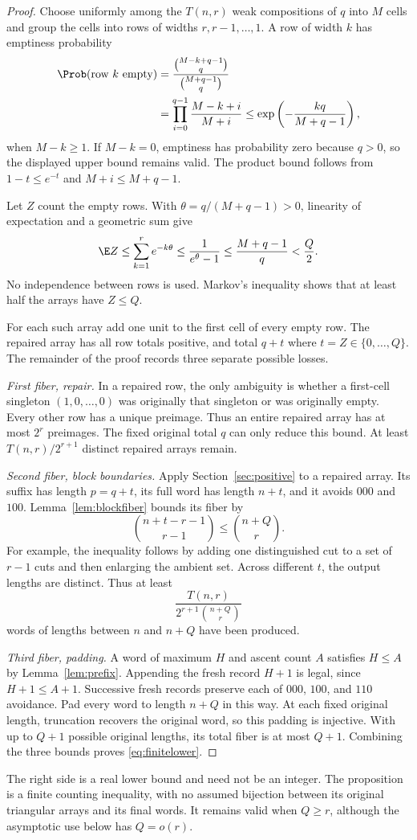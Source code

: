 \begin{proof}
Choose uniformly among the $T(n,r)$ weak compositions of $q$ into $M$ cells and group the cells into rows of widths $r,r-1,\ldots,1$. A row of width $k$ has emptiness probability
\begin{align}
 \Prob(\text{row }k\text{ empty})
 &=\frac{\binom{M-k+q-1}{q}}{\binom{M+q-1}{q}}\notag\\
 &=\prod_{i=0}^{q-1}\frac{M-k+i}{M+i}
 \le\exp\left(-\frac{kq}{M+q-1}\right),\label{eq:empty}
\end{align}
when $M-k\ge1$. If $M-k=0$, emptiness has probability zero because $q>0$, so the displayed upper bound remains valid. The product bound follows from $1-t\le e^{-t}$ and $M+i\le M+q-1$.

Let $Z$ count the empty rows. With $\theta=q/(M+q-1)>0$, linearity of expectation and a geometric sum give
\begin{equation}\label{eq:expect}
 \E Z\le\sum_{k=1}^r e^{-k\theta}
 \le\frac1{e^\theta-1}\le\frac{M+q-1}{q}<\frac Q2.
\end{equation}
No independence between rows is used. Markov's inequality shows that at least half the arrays have $Z\le Q$.

For each such array add one unit to the first cell of every empty row. The repaired array has all row totals positive, and total $q+t$ where $t=Z\in\{0,\ldots,Q\}$. The remainder of the proof records three separate possible losses.

\emph{First fiber, repair.} In a repaired row, the only ambiguity is whether a first-cell singleton $(1,0,\ldots,0)$ was originally that singleton or was originally empty. Every other row has a unique preimage. Thus an entire repaired array has at most $2^r$ preimages. The fixed original total $q$ can only reduce this bound. At least $T(n,r)/2^{r+1}$ distinct repaired arrays remain.

\emph{Second fiber, block boundaries.} Apply Section~\ref{sec:positive} to a repaired array. Its suffix has length $p=q+t$, its full word has length $n+t$, and it avoids $000$ and $100$. Lemma~\ref{lem:blockfiber} bounds its fiber by
\[
 \binom{n+t-r-1}{r-1}\le\binom{n+Q}{r}.
\]
For example, the inequality follows by adding one distinguished cut to a set of $r-1$ cuts and then enlarging the ambient set. Across different $t$, the output lengths are distinct. Thus at least
\[
 \frac{T(n,r)}{2^{r+1}\binom{n+Q}{r}}
\]
words of lengths between $n$ and $n+Q$ have been produced.

\emph{Third fiber, padding.} A word of maximum $H$ and ascent count $A$ satisfies $H\le A$ by Lemma~\ref{lem:prefix}. Appending the fresh record $H+1$ is legal, since $H+1\le A+1$. Successive fresh records preserve each of $000$, $100$, and $110$ avoidance. Pad every word to length $n+Q$ in this way. At each fixed original length, truncation recovers the original word, so this padding is injective. With up to $Q+1$ possible original lengths, its total fiber is at most $Q+1$. Combining the three bounds proves \eqref{eq:finitelower}.
\end{proof}
The right side is a real lower bound and need not be an integer. The proposition is a finite counting inequality, with no assumed bijection between its original triangular arrays and its final words. It remains valid when $Q\ge r$, although the asymptotic use below has $Q=o(r)$.
